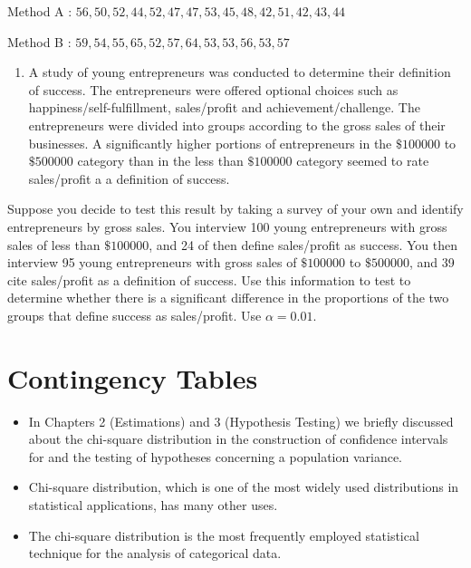 \documentclass[]{book}
\providecommand{\tightlist}{%
  \setlength{\itemsep}{0pt}\setlength{\parskip}{0pt}}
\begin{document}
Method A : \(56,50,52,44,52,47,47,53,45,48,42,51,42,43,44\)

Method B : \(59,54,55,65,52,57,64,53,53,56,53,57\)

\begin{enumerate}
\def\labelenumi{\arabic{enumi}.}
\setcounter{enumi}{11}
\tightlist
\item
  A study of young entrepreneurs was conducted to determine their definition of success. The entrepreneurs were offered optional choices such as happiness/self-fulfillment, sales/profit and achievement/challenge. The entrepreneurs were divided into groups according to the gross sales of their businesses. A significantly higher portions of entrepreneurs in the \(\$100000\) to \(\$500000\) category than in the less than \(\$100000\) category seemed to rate sales/profit a a definition of success.
\end{enumerate}

Suppose you decide to test this result by taking a survey of your own and identify entrepreneurs by gross sales. You interview 100 young entrepreneurs with gross sales of less than \(\$100000\), and 24 of then define sales/profit as success. You then interview 95 young entrepreneurs with gross sales of \(\$100000\) to \(\$500000\), and 39 cite sales/profit as a definition of success. Use this information to test to determine whether there is a significant difference in the proportions of the two groups that define success as sales/profit. Use \(\alpha =0.01.\)

\hypertarget{contingency-tables}{%
\chapter{Contingency Tables}\label{contingency-tables}}


\begin{itemize}
\item
  In Chapters 2 (Estimations) and 3 (Hypothesis Testing) we briefly discussed about the chi-square distribution in the construction of confidence intervals for and the testing of hypotheses concerning a population variance.
\item
  Chi-square distribution, which is one of the most widely used distributions in statistical applications, has many other uses.
\item
  The chi-square distribution is the most frequently employed statistical technique for the analysis of categorical data.
\end{itemize}
\end{document}
